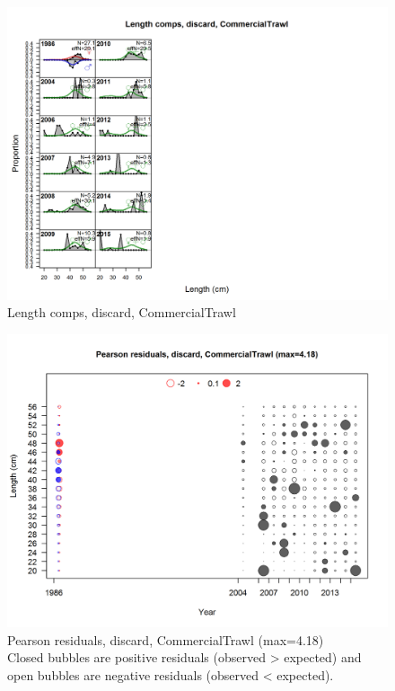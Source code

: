 \documentclass[12pt,]{article}
\begin{document}
\begin{figure}[htbp]
\centering
\includegraphics{./r4ss/plots_mod1/comp_lenfit_flt1mkt1.png}
\caption{Length comps, discard, CommercialTrawl
\label{fig:mod1_6_comp_lenfit_flt1mkt1}}
\end{figure}

\begin{figure}[htbp]
\centering
\includegraphics{./r4ss/plots_mod1/comp_lenfit_residsflt1mkt1.png}
\caption{Pearson residuals, discard, CommercialTrawl (max=4.18)\\
Closed bubbles are positive residuals (observed \textgreater{} expected)
and open bubbles are negative residuals (observed \textless{} expected).
\label{fig:mod1_7_comp_lenfit_residsflt1mkt1}}
\end{figure}
\end{document}
